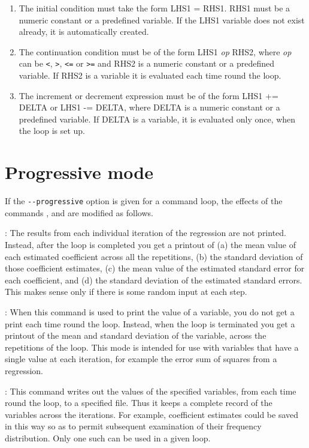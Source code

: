 \begin{enumerate}
\item The initial condition must take the form LHS1 = RHS1.  RHS1 must
  be a numeric constant or a predefined variable.  If the LHS1
  variable does not exist already, it is automatically created.
\item The continuation condition must be of the form LHS1 \textsl{op} RHS2,
  where \textsl{op} can be \verb+<+, \verb+>+, \verb+<=+ or \verb+>=+ and RHS2
  is a numeric constant or a predefined variable.  If RHS2 is a
  variable it is evaluated each time round the loop.
\item The increment or decrement expression must be of the form LHS1
  += DELTA or LHS1 -= DELTA, where DELTA is a numeric constant or a
  predefined variable.  If DELTA is a variable, it is evaluated only
  once, when the loop is set up.
\end{enumerate}
      

\section{Progressive mode}
\label{loop-progressive}

If the \verb+--progressive+ option is given for a command loop, the
effects of the commands ,  and  are
modified as follows.

: The results from each individual iteration of the
regression are not printed.  Instead, after the loop is completed you
get a printout of (a) the mean value of each estimated coefficient
across all the repetitions, (b) the standard deviation of those
coefficient estimates, (c) the mean value of the estimated standard
error for each coefficient, and (d) the standard deviation of the
estimated standard errors.  This makes sense only if there is some
random input at each step.

: When this command is used to print the value of a
variable, you do not get a print each time round the loop.  Instead,
when the loop is terminated you get a printout of the mean and
standard deviation of the variable, across the repetitions of the
loop.  This mode is intended for use with variables that have a single
value at each iteration, for example the error sum of squares from a
regression.

: This command writes out the values of the specified
variables, from each time round the loop, to a specified file.  Thus
it keeps a complete record of the variables across the iterations.
For example, coefficient estimates could be saved in this way so as to
permit subsequent examination of their frequency distribution. Only
one such  can be used in a given loop.

